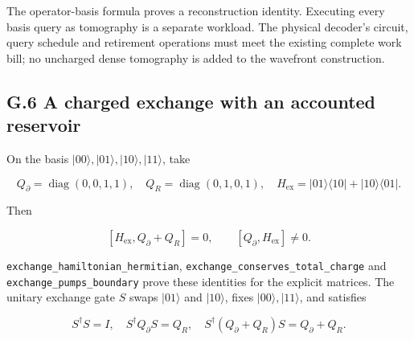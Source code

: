 \documentclass[
]{article}
\begin{document}
The operator-basis formula proves a reconstruction identity. Executing
every basis query as tomography is a separate workload. The physical
decoder's circuit, query schedule and retirement operations must meet
the existing complete work bill; no uncharged dense tomography is added
to the wavefront construction.

\subsection{G.6 A charged exchange with an accounted
reservoir}\label{g.6-a-charged-exchange-with-an-accounted-reservoir}

On the basis \(|00\rangle,|01\rangle,|10\rangle,|11\rangle\), take

\[
Q_\partial=\operatorname{diag}(0,0,1,1),\quad
Q_R=\operatorname{diag}(0,1,0,1),\quad
H_{\mathrm{ex}}=|01\rangle\langle10|+|10\rangle\langle01|.
\]

Then

\[
[H_{\mathrm{ex}},Q_\partial+Q_R]=0,\qquad
[Q_\partial,H_{\mathrm{ex}}]\ne0.
\]

\texttt{e\allowbreak{}x\allowbreak{}c\allowbreak{}h\allowbreak{}a\allowbreak{}n\allowbreak{}g\allowbreak{}e\allowbreak{}\_\allowbreak{}h\allowbreak{}a\allowbreak{}m\allowbreak{}i\allowbreak{}l\allowbreak{}t\allowbreak{}o\allowbreak{}n\allowbreak{}i\allowbreak{}a\allowbreak{}n\allowbreak{}\_\allowbreak{}h\allowbreak{}e\allowbreak{}r\allowbreak{}m\allowbreak{}i\allowbreak{}t\allowbreak{}i\allowbreak{}a\allowbreak{}n},
\texttt{e\allowbreak{}x\allowbreak{}c\allowbreak{}h\allowbreak{}a\allowbreak{}n\allowbreak{}g\allowbreak{}e\allowbreak{}\_\allowbreak{}c\allowbreak{}o\allowbreak{}n\allowbreak{}s\allowbreak{}e\allowbreak{}r\allowbreak{}v\allowbreak{}e\allowbreak{}s\allowbreak{}\_\allowbreak{}t\allowbreak{}o\allowbreak{}t\allowbreak{}a\allowbreak{}l\allowbreak{}\_\allowbreak{}c\allowbreak{}h\allowbreak{}a\allowbreak{}r\allowbreak{}g\allowbreak{}e}
and
\texttt{e\allowbreak{}x\allowbreak{}c\allowbreak{}h\allowbreak{}a\allowbreak{}n\allowbreak{}g\allowbreak{}e\allowbreak{}\_\allowbreak{}p\allowbreak{}u\allowbreak{}m\allowbreak{}p\allowbreak{}s\allowbreak{}\_\allowbreak{}b\allowbreak{}o\allowbreak{}u\allowbreak{}n\allowbreak{}d\allowbreak{}a\allowbreak{}r\allowbreak{}y}
prove these identities for the explicit matrices. The unitary exchange
gate \(S\) swaps \(|01\rangle\) and \(|10\rangle\), fixes
\(|00\rangle,|11\rangle\), and satisfies

\[
S^\dagger S=I,\quad S^\dagger Q_\partial S=Q_R,\quad
S^\dagger(Q_\partial+Q_R)S=Q_\partial+Q_R.
\]
\end{document}
